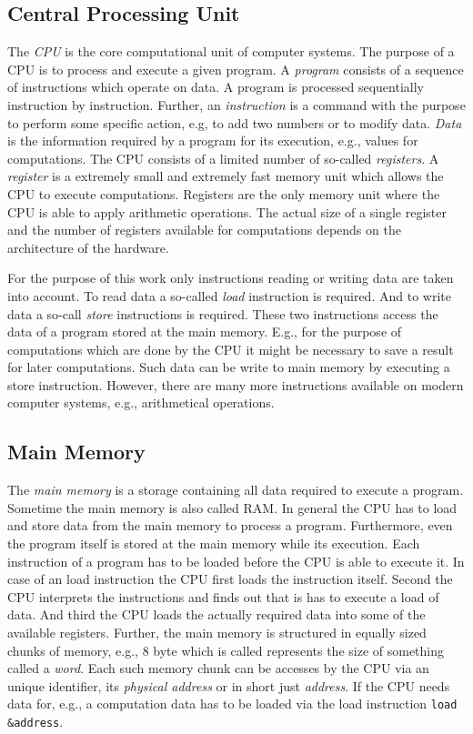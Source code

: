 \documentclass[onecolumn, openany, master, english, seal, signatures]{dbrgrptt}
\begin{document}
\subsection{Central Processing Unit}
The \emph{\ac{CPU}} is the core computational unit of computer systems. The purpose of a \ac{CPU} is to process and execute a given program. A \emph{program} consists of a sequence of instructions which operate on data. A program is processed sequentially instruction by instruction. Further, an \emph{instruction} is a command with the purpose to perform some specific action, e.g, to add two numbers or to modify data. \emph{Data} is the information required by a program for its execution, e.g., values for computations. The \ac{CPU} consists of a limited number of so-called \emph{registers}. A \emph{register} is a extremely small and extremely fast memory unit which allows the \ac{CPU} to execute computations. Registers are the only memory unit where the \ac{CPU} is able to apply arithmetic operations. The actual size of a single register and the number of registers available for computations depends on the architecture of the hardware.

For the purpose of this work only instructions reading or writing data are taken into account. To read data a so-called \emph{load} instruction is required. And to write data a so-call \emph{store} instructions is required. These two instructions access the data of a program stored at the main memory. E.g., for the purpose of computations which are done by the \ac{CPU} it might be necessary to save a result for later computations. Such data can be write to main memory by executing a store instruction. However, there are many more instructions available on modern computer systems, e.g., arithmetical operations.

\subsection{Main Memory}
The \emph{main memory} is a storage containing all data required to execute a program. Sometime the main memory is also called \ac{RAM}. In general the CPU has to load and store data from the main memory to process a program. Furthermore, even the program itself is stored at the main memory while its execution. Each instruction of a program has to be loaded before the \ac{CPU} is able to execute it. In case of an load instruction the \ac{CPU} first loads the instruction itself. Second the CPU interprets the instructions and finds out that is has to execute a load of data. And third the \ac{CPU} loads the actually required data into some of the available registers.
Further, the main memory is structured in equally sized chunks of memory, e.g., 8 byte which is called represents the size of something called a \emph{word}. Each such memory chunk can be accesses by the \ac{CPU} via an unique identifier, its \emph{physical address} or in short just \emph{address}. If the CPU needs data for, e.g., a computation data has to be loaded via the load instruction \texttt{load \&address}.
\end{document}
